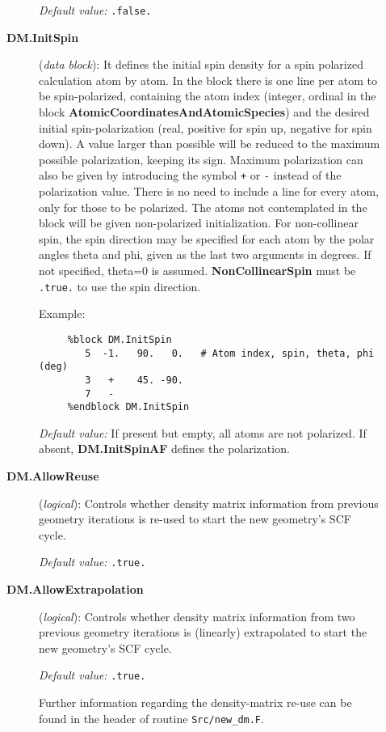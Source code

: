 \documentclass[11pt]{article}
\begin{document}
\begin{description}
\begin{description}
{\it Default value:} {\tt .false.}


\item[{\bf DM.InitSpin}] ({\it data block}): 
 It defines the
initial spin density for a spin polarized calculation atom by atom.
In the block there is one line per atom to be spin-polarized, 
containing the atom index (integer, ordinal in the block
{\bf AtomicCoordinatesAndAtomicSpecies}) and the desired
initial spin-polarization (real, positive for spin up, negative for
spin down). A value larger than possible will be reduced
to the maximum possible polarization, keeping its sign. 
Maximum polarization can also be given by introducing the
symbol {\tt +} or {\tt -} instead of the polarization value.
There is no need to include a line for every atom, only for
those to be polarized. The atoms not contemplated in the block will
be given non-polarized initialization.
For non-collinear spin, the spin direction may be specified for
each atom by the polar angles theta and phi, given as the last
two arguments in degrees. If not specified, theta=0 is assumed.
{\bf NonCollinearSpin} must be {\tt .true.} to use the spin direction.

Example:

\begin{verbatim}
     %block DM.InitSpin
        5  -1.   90.   0.   # Atom index, spin, theta, phi (deg)
        3   +    45. -90.
        7   -
     %endblock DM.InitSpin
\end{verbatim}

{\it Default value:} If present but empty, all atoms are not polarized. 
If absent, {\bf DM.InitSpinAF} defines the polarization.

\item[{\bf DM.AllowReuse}] ({\it logical}):
Controls whether density matrix information from previous geometry 
iterations is re-used to start the new geometry's SCF cycle.

{\it Default value:} {\tt .true.}

\item[{\bf DM.AllowExtrapolation}] ({\it logical}):
Controls whether density matrix information from two previous geometry 
iterations is (linearly) extrapolated to start the new geometry's SCF cycle.

{\it Default value:} {\tt .true.}

Further information regarding the density-matrix re-use can be found
in the header of routine {\tt Src/new\_dm.F}.


\end{description}
\end{description}
\end{document}
